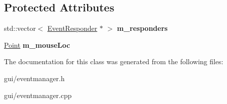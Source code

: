 \subsection*{Protected Attributes}
\begin{DoxyCompactItemize}
\item 
std\+::vector$<$ \hyperlink{classEventResponder}{Event\+Responder} $\ast$ $>$ {\bfseries m\+\_\+responders}\hypertarget{classEventManager_a39e5d700ce23e46a667eee89114e49ac}{}\label{classEventManager_a39e5d700ce23e46a667eee89114e49ac}

\item 
\hyperlink{classPoint}{Point} {\bfseries m\+\_\+mouse\+Loc}\hypertarget{classEventManager_aab8efd880880fc6830dd864f52f46191}{}\label{classEventManager_aab8efd880880fc6830dd864f52f46191}

\end{DoxyCompactItemize}


The documentation for this class was generated from the following files\+:\begin{DoxyCompactItemize}
\item 
gui/eventmanager.\+h\item 
gui/eventmanager.\+cpp\end{DoxyCompactItemize}
